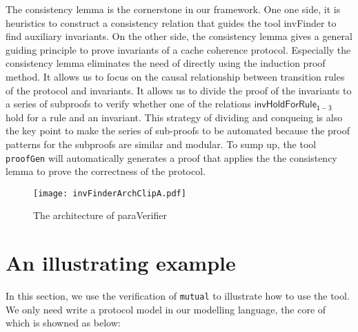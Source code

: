 \documentclass{llncs}
\begin{document}
The consistency lemma is the cornerstone in our framework.  One one
side, it is heuristics to construct a consistency relation that
guides the tool {\sf invFinder} to find auxiliary invariants. On the
other side, the consistency lemma gives a general guiding principle
to prove invariants of a cache coherence protocol. Especially the
consistency lemma eliminates the need of directly using the
induction proof method. It allows us to focus on  the causal
relationship between transition rules of the protocol and
invariants. It allows us to divide the proof of the invariants to a
series of subproofs to verify whether one of the relations
$\mathsf{invHoldForRule_{1-3}}$ hold
  for  a rule  and an invariant. This strategy of dividing and
  conqueing is also the key point to make the series of sub-proofs
  to be automated because the proof patterns for the  subproofs  are similar
  and modular. To sump up, the tool \texttt{proofGen} will
  automatically generates a proof that applies the the consistency
  lemma to prove the correctness of the protocol.


 \begin{figure}[!ht]
 \vspace{-0.8cm}
\texttt{[image: invFinderArchClipA.pdf]}
 \caption{The architecture of {\sf paraVerifier}}
\label{fig:arch}
\end{figure}
 \vspace{1cm}


\section{An illustrating example}
In this section, we use the verification of {\tt mutual}   to illustrate how to use the tool.
We only need write a protocol model in our modelling language, the core of which is showned as below:
\end{document}
